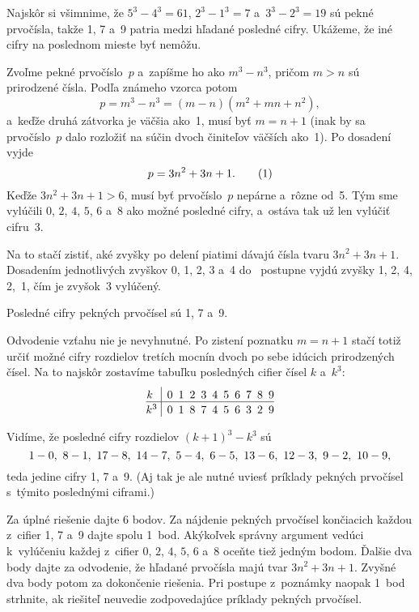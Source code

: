 {%
Najskôr si všimnime, že $5^3-4^3 = 61$, $2^3-1^3 = 7$ a~$3^3-2^3 =19$
sú pekné prvočísla, takže 1, 7 a~9 patria medzi hľadané posledné cifry.
Ukážeme, že iné cifry na poslednom mieste byť nemôžu.

Zvoľme pekné prvočíslo~$p$ a~zapíšme ho ako $m^3 - n^3$, pričom $m>n$
sú prirodzené čísla. Podľa známeho vzorca potom
$$
p = m^3-n^3 = (m-n)(m^2+mn+n^2),
$$
a~keďže druhá zátvorka je väčšia ako~1, musí byť $m = n+1$
(inak by sa prvočíslo~$p$ dalo rozložiť na súčin dvoch činiteľov väčších ako~1).
Po dosadení vyjde
$$
p = 3n^2 + 3n+1.\tag1
$$
Keďže $3n^2 + 3n+1 > 6$, musí byť prvočíslo~$p$ nepárne a~rôzne od~5. Tým sme vylúčili $0$, $2$, $4$, $5$, $6$ a~$8$ ako možné
posledné cifry, a~ostáva tak už len vylúčiť cifru~3.

Na to stačí zistiť, aké zvyšky po delení piatimi dávajú
čísla tvaru $3n^2 + 3n+1$. Dosadením jednotlivých zvyškov 0, 1, 2, 3 a~4
do~
postupne vyjdú
zvyšky 1, 2, 4, 2,~1, čím je zvyšok~3 vylúčený.

\odpoved
Posledné cifry pekných prvočísel sú 1, 7 a~9.

\poznamka
Odvodenie vzťahu  nie je nevyhnutné. Po zistení
poznatku $m=n+1$ stačí totiž určiť možné cifry rozdielov
tretích mocnín dvoch po sebe idúcich prirodzených čísel. Na to
najskôr zostavíme tabuľku posledných cifier čísel $k$ a~$k^3$:
$$
\def\strut{\vrule width 0pt height1em depth.3em\relax}
\vbox{\halign{\hss$#$\hss\ \strut\vrule&&\enspace $#$\cr
k~& 0& 1& 2& 3& 4& 5& 6& 7& 8& 9\cr\noalign{\hrule}
k^3 & 0& 1& 8& 7& 4& 5& 6& 3& 2& 9\cr}}
$$

Vidíme, že posledné cifry rozdielov $(k+1)^3-k^3$ sú
$$
\let\,\
1-0,\,8-1,\,17-8,\,14-7,\,5-4,\,6-5,\,13-6,\,12-3,\,9-2,\,10-9,
$$
teda jedine cifry 1, 7 a~9. (Aj tak je ale nutné uviesť príklady
pekných prvočísel s~týmito poslednými ciframi.)


\nobreak\medskip\petit\noindent
Za úplné riešenie dajte 6 bodov.
Za nájdenie pekných prvočísel končiacich každou
z~cifier 1, 7 a~9 dajte spolu 1~bod. Akýkoľvek správny argument
vedúci k~vylúčeniu každej z~cifier $0$, $2$, $4$, $5$, $6$ a~$8$ oceňte
tiež jedným bodom. Ďalšie dva body dajte za odvodenie, že hľadané prvočísla
majú tvar $3n^2 + 3n+1$. Zvyšné dva body potom za dokončenie riešenia.
Pri postupe z~poznámky naopak 1~bod strhnite, ak riešiteľ neuvedie
zodpovedajúce príklady pekných prvočísel.
\endpetit
\bigbreak
}


